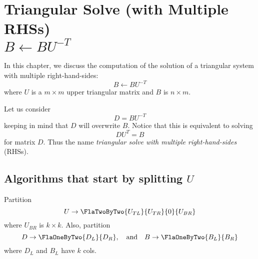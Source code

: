 %
%
\chapter{Triangular Solve (with Multiple RHSs)\\
$ B \leftarrow B U^{-T} $ }
\label{chapter:trsm_rut}




In this chapter, we discuss the computation of the
solution of a triangular system with multiple right-hand-sides:
\[
B \leftarrow B U^{-T}
\]
where $ U $ is a $ m \times m $ upper triangular matrix
and $ B $ is $ n \times m $.

Let us consider
\begin{equation}
D = B U^{-T}
\end{equation} 
keeping in mind that $ D $ will
overwrite $ B $.
Notice that this is equivalent to solving
\begin{equation}
\label{eqn:utrsm1}
D U^{T} = B 
\end{equation} 
for matrix $ D$.  
Thus the name {\em triangular solve with multiple right-hand-sides} (RHSs).

\section{Algorithms that start by splitting $ U $}
\label{sec:teaml_ltrmmU}

Partition
\[
U \rightarrow \FlaTwoByTwo{ U_{TL} }{ U_{TR} }
                          {   0    }{ U_{BR} }
\]
where $ U_{BR} $ is $ k \times k $.
Also, partition
\[
D \rightarrow \FlaOneByTwo{ D_{L} }
                          { D_{R} },
\quad
\mbox{and}
\quad
B \rightarrow \FlaOneByTwo{ B_{L} }
                          { B_{R} }
\]
where $ D_{L} $ and $ B_{L} $ have $ k$ cols.

